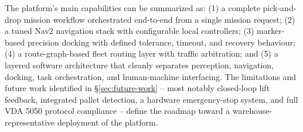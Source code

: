 \documentclass[a4paper, 12pt]{article}
\begin{document}
The platform's main capabilities can be summarized as: (1) a complete
pick-and-drop mission workflow orchestrated end-to-end from a single
mission request; (2) a tuned Nav2 navigation stack with configurable
local controllers; (3) marker-based precision docking with defined
tolerance, timeout, and recovery behaviour; (4) a route-graph-based
fleet routing layer with traffic arbitration; and (5) a layered software
architecture that cleanly separates perception, navigation, docking,
task orchestration, and human-machine interfacing. The limitations and
future work identified in \S\ref{sec:future-work} -- most notably
closed-loop lift feedback, integrated pallet detection, a hardware
emergency-stop system, and full VDA 5050 protocol compliance -- define
the roadmap toward a warehouse-representative deployment of the
platform.
\end{document}
